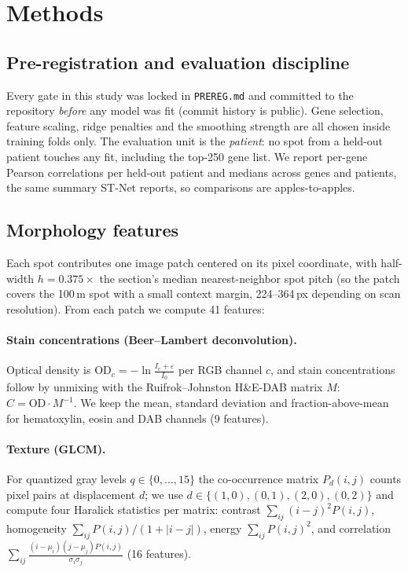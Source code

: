 \documentclass[11pt]{article}
\begin{document}
\section{Methods}
\subsection{Pre-registration and evaluation discipline}
Every gate in this study was locked in \texttt{PREREG.md} and committed to the
repository \emph{before} any model was fit (commit history is public). Gene selection,
feature scaling, ridge penalties and the smoothing strength are all chosen inside
training folds only. The evaluation unit is the \emph{patient}: no spot from a
held-out patient touches any fit, including the top-250 gene list. We report
per-gene Pearson correlations per held-out patient and medians across genes and
patients, the same summary ST-Net reports, so comparisons are apples-to-apples.

\subsection{Morphology features}
Each spot contributes one image patch centered on its pixel coordinate, with
half-width $h = 0.375 \times$ the section's median nearest-neighbor spot pitch
(so the patch covers the 100\,\textmu m spot with a small context margin, 224--364\,px
depending on scan resolution). From each patch we compute 41 features:

\paragraph{Stain concentrations (Beer--Lambert deconvolution).} Optical density is
$\mathrm{OD}_c = -\ln\frac{I_c + \varepsilon}{I_0}$ per RGB channel $c$, and stain
concentrations follow by unmixing with the Ruifrok--Johnston H\&E-DAB matrix $M$:
$C = \mathrm{OD} \cdot M^{-1}$. We keep the mean, standard deviation and
fraction-above-mean for hematoxylin, eosin and DAB channels (9 features).

\paragraph{Texture (GLCM).} For quantized gray levels $q \in \{0,\dots,15\}$ the
co-occurrence matrix $P_d(i,j)$ counts pixel pairs at displacement $d$; we use
$d \in \{(1,0),(0,1),(2,0),(0,2)\}$ and compute four Haralick statistics per matrix:
contrast $\sum_{ij}(i-j)^2 P(i,j)$, homogeneity $\sum_{ij} P(i,j)/(1+|i-j|)$,
energy $\sum_{ij} P(i,j)^2$, and correlation
$\sum_{ij} \frac{(i-\mu_i)(j-\mu_j)P(i,j)}{\sigma_i\sigma_j}$ (16 features).
\end{document}
